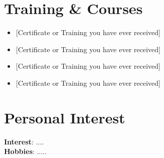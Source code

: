 \documentclass[letterpaper,11pt]{article}
\newcommand{\resumeItem}[1]{
  \item\small{
    {#1 \vspace{-2pt}}
  }
}
\newcommand{\resumeItemListStart}{\begin{itemize}}
\newcommand{\resumeItemListEnd}{\end{itemize}\vspace{-5pt}}
\begin{document}
\section{Training \& Courses}
 \begin{itemize}[leftmargin=0.01in, label={}]
    \small{\item{
        \resumeItemListStart
            \resumeItem{[Certificate or Training you have ever received]}
            \resumeItem{[Certificate or Training you have ever received]}
            \resumeItem{[Certificate or Training you have ever received]}
            \resumeItem{[Certificate or Training you have ever received]}
        \resumeItemListEnd
    }}
 \end{itemize}

\section{Personal Interest}
 \begin{itemize}[leftmargin=0.15in, label={}]
    \small{\item{
     \textbf{Interest}{: ....} \\
     \textbf{Hobbies}{: .....} \\
    }}
 \end{itemize}
 
\end{document}
